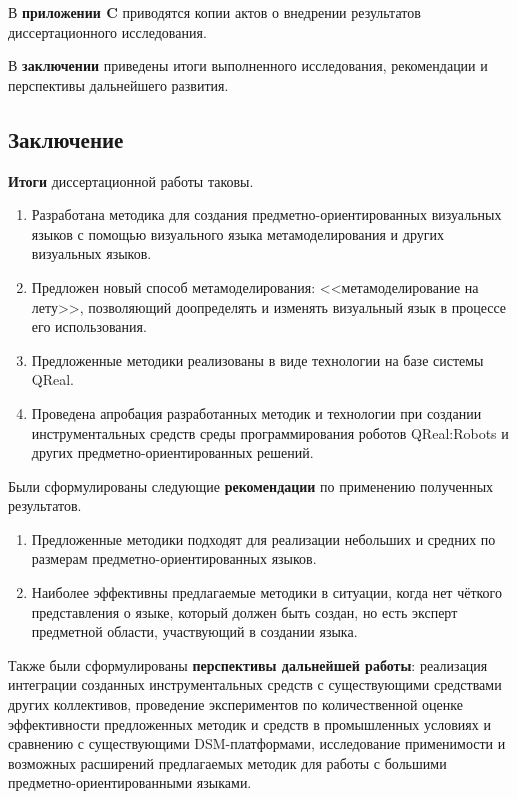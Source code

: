 В \textbf{приложении C} приводятся копии актов о внедрении результатов диссертационного исследования.

В \textbf{заключении} приведены итоги выполненного исследования, рекомендации и перспективы дальнейшего развития.

\subsection*{\Large Заключение}
\textbf{Итоги} диссертационной работы таковы.
\begin{enumerate}
	\item Разработана методика для создания предметно-ориентированных визуальных языков с помощью 
		визуального языка метамоделирования и других визуальных языков.
	\item Предложен новый способ метамоделирования: <<метамоделирование на лету>>, позволяющий
		доопределять и изменять визуальный язык в процессе его использования.
	\item Предложенные методики реализованы в виде технологии на базе системы QReal.
	\item Проведена апробация разработанных методик и технологии при создании инструментальных средств 
		среды программирования роботов QReal:Robots и других предметно-ориентированных решений.
\end{enumerate}
Были сформулированы следующие \textbf{рекомендации} по применению полученных результатов.
\begin{enumerate}
	\item Предложенные методики подходят для реализации небольших и средних по размерам 
		предметно-ориентированных языков.
	\item Наиболее эффективны предлагаемые методики в ситуации, когда нет чёткого представления
		о языке, который должен быть создан, но есть эксперт предметной области, участвующий
		в создании языка.
\end{enumerate}
Также были сформулированы \textbf{перспективы дальнейшей работы}: реализация интеграции 
созданных инструментальных средств с существующими средствами других коллективов, 
проведение экспериментов по количественной оценке эффективности предложенных методик 
и средств в промышленных условиях и сравнению с существующими DSM-платформами, исследование 
применимости и возможных расширений предлагаемых методик для работы с большими предметно-ориентированными 
языками.






















